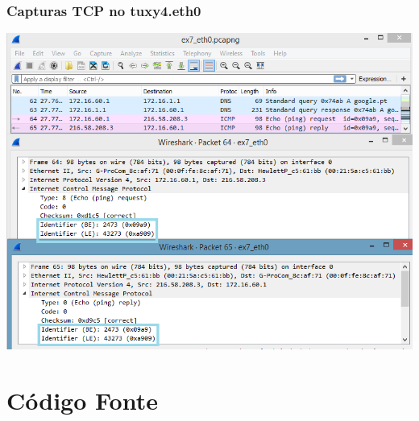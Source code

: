 \documentclass[11pt,a4paper,reqno]{report}
\numberwithin{equation}{section}
\begin{document}
\begin{appendices}
\subsection{Capturas TCP no tuxy4.eth0}
\label{ex7_ping}
\includegraphics[width=18cm]{ex7_ping.png}

\chapter{Código Fonte}






\pagebreak


\end{appendices}
\end{document}

